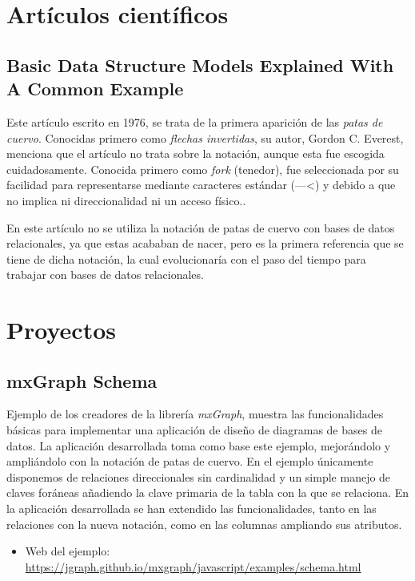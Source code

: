 
\section{Artículos científicos}

\subsection{Basic Data Structure Models Explained With A Common Example}
Este artículo escrito en 1976, se trata de la primera aparición de las \emph{patas de cuervo}. Conocidas primero como \emph{flechas invertidas}, su autor, Gordon C. Everest, menciona que el artículo no trata sobre la notación, aunque esta fue escogida cuidadosamente. Conocida primero como \emph{fork} (tenedor), fue seleccionada por su facilidad para representarse mediante caracteres estándar (---<) y debido a que no implica ni direccionalidad ni un acceso físico.\cite{ge-bdsm}.

En este artículo no se utiliza la notación de patas de cuervo con bases de datos relacionales, ya que estas acababan de nacer, pero es la primera referencia que se tiene de dicha notación, la cual evolucionaría con el paso del tiempo para trabajar con bases de datos relacionales.

\section{Proyectos}

\subsection{mxGraph Schema}
Ejemplo de los creadores de la librería \emph{mxGraph}, muestra las funcionalidades básicas para implementar una aplicación de diseño de diagramas de bases de datos. La aplicación desarrollada toma como base este ejemplo, mejorándolo y ampliándolo con la notación de patas de cuervo. En el ejemplo únicamente disponemos de relaciones direccionales sin cardinalidad y un simple manejo de claves foráneas añadiendo la clave primaria de la tabla con la que se relaciona. En la aplicación desarrollada se han extendido las funcionalidades, tanto en las relaciones con la nueva notación, como en las columnas ampliando sus atributos.

\begin{itemize}
    \item Web del ejemplo: \url{https://jgraph.github.io/mxgraph/javascript/examples/schema.html}
\end{itemize}

